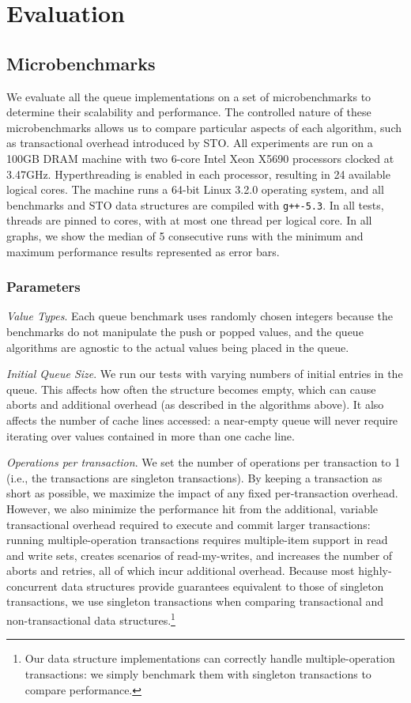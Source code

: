 \section{Evaluation}

\subsection{Microbenchmarks}
\label{q_microbenchmarks}

We evaluate all the queue implementations on a set of microbenchmarks to determine their scalability and performance. The controlled nature of these microbenchmarks allows us to compare particular aspects of each algorithm, such as transactional overhead introduced by STO. All experiments are run on a 100GB DRAM machine with two 6-core Intel Xeon X5690 processors clocked at 3.47GHz. Hyperthreading is enabled in each processor, resulting in 24 available logical cores. The machine runs a 64-bit Linux 3.2.0 operating system, and all benchmarks and STO data structures are compiled with \texttt{g++-5.3}. In all tests, threads are pinned to cores, with at most one thread per logical core.
In all graphs, we show the median of 5 consecutive runs with the minimum and maximum performance results represented as error bars.

\subsubsection{Parameters}

\emph{Value Types}. Each queue benchmark uses randomly chosen integers because the benchmarks do not manipulate the push or popped values, and the queue algorithms are agnostic to the actual values being placed in the queue.

\emph{Initial Queue Size}. We run our tests with varying numbers of initial entries in the queue. This affects how often the structure becomes empty, which can cause aborts and additional overhead (as described in the algorithms above). It also affects the number of cache lines accessed: a near-empty queue will never require iterating over values contained in more than one cache line.

\emph{Operations per transaction}. We set the number of operations per transaction to 1 (i.e., the transactions are singleton transactions). By keeping a transaction as short as possible, we maximize the impact of any fixed per-transaction overhead. However, we also minimize the performance hit from the additional, variable transactional overhead required to execute and commit larger transactions: running multiple-operation transactions requires multiple-item support in read and write sets, creates scenarios of read-my-writes, and increases the number of aborts and retries, all of which incur additional overhead. 
Because most highly-concurrent data structures provide guarantees equivalent to those of singleton transactions, we use singleton transactions when comparing transactional and non-transactional data structures.\footnote{Our data structure implementations can correctly handle multiple-operation transactions: we simply benchmark them with singleton transactions to compare performance.}

